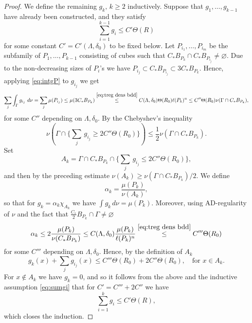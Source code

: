 \begin{proof}
	We define the remaining $g_k,\, k\ge 2$ inductively. Suppose that $g_1,\dots,g_{k-1}$ have already been constructed, and they satisfy
	\begin{equation}\label{eq:sumgi}
	\sum_{i=1}^{k-1} g_i \le C' \Theta(R)
	\end{equation}
	for some constant $C'=C'(\Lambda,\delta_0)$ to be fixed below. Let $P_{i_1},\dots,P_{i_m}$ be the subfamily of $P_1,\dots,P_{k-1}$ consisting of cubes such that $C_* B_{P_k}\cap C_* B_{P_{i_j}}\neq\varnothing$. Due to the non-decreasing sizes of $P_i$'s we have $P_{i_j}\subset C_* B_{P_{i_j}}\subset 3C_* B_{P_k}$. Hence, applying \eqref{eq:intgP} to $g_{i_j}$ we get
	\begin{equation*}
	\sum_j \int_{\Gamma} g_{i_j}\ d\nu = \sum_j\mu(P_{i_j})\le\mu(3C_* B_{P_k})\overset{\eqref{eq:treg dens bdd}}{\le}C({\Lambda,\delta_0})\Theta(R_0)\ell(P_k)^n\le C''\Theta(R_0)\nu(\Gamma\cap C_* B_{P_k}),
	\end{equation*}
	for some $C''$ depending on $\Lambda,\delta_0$. By the Chebyshev's inequality
	\begin{equation*}
	\nu\left(\Gamma\cap\big\{\textstyle{\sum_j}\, g_{i_j}\ge 2C''\Theta(R_0)\big\}\right)\le \frac{1}{2}\nu(\Gamma\cap C_* B_{P_k}).
	\end{equation*}
	Set
	\begin{equation*}
	A_k = \Gamma\cap C_* B_{P_k}\cap \big\{\textstyle{\sum_j}\, g_{i_j}\le 2C''\Theta(R_0)\big\},
	\end{equation*}
	and then by the preceding estimate $\nu(A_k)\ge \nu(\Gamma\cap C_* B_{P_k})/2.$ We define
	\begin{equation*}
	\alpha_k = \frac{\mu(P_k)}{\nu(A_k)},
	\end{equation*}
	so that for $g_k=\alpha_k\chi_{A_k}$ we have $\int g_k\, d\nu = \mu(P_k)$. Moreover, using AD-regularity of $\nu$ and the fact that $\frac{C_*}{2} B_{P_k}\cap\Gamma\neq\varnothing$
	\begin{equation*}
	\alpha_k \le 2 \frac{\mu(P_k)}{\nu(C_* B_{P_k})} \le C({\Lambda,\delta_0})\frac{\mu(P_k)}{\ell(P_k)^n}\overset{\eqref{eq:treg dens bdd}}{\le} C'''\Theta(R_0)
	\end{equation*}
	for some $C'''$ depending on $\Lambda,\delta_0$. Hence, by the definition of $A_k$
	\begin{equation*}
	g_k(x) + \sum_j g_{i_j}(x) \le C'''\Theta(R_0) + 2C''\Theta(R_0), \quad\text{for $x\in A_k$.}
	\end{equation*}
	For $x\not\in A_k$ we have $g_k=0$, and so it follows from the above and the inductive assumption \eqref{eq:sumgi} that for $C' = C''' + 2C''$ we have
	\begin{equation*}
	\sum_{i=1}^{k} g_i \le C' \Theta(R),
	\end{equation*}
	which closes the induction.
	

\end{proof}
